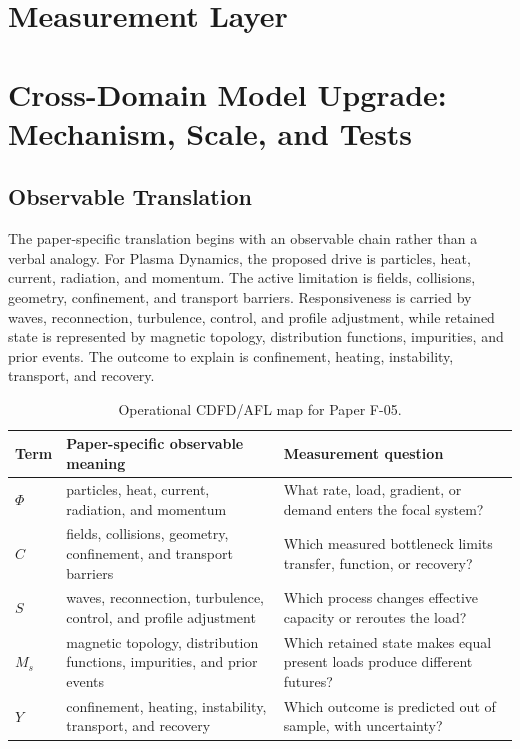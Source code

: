 \documentclass[11pt,a4paper]{article}
\begin{document}
\section{Measurement Layer}

\section{Cross-Domain Model Upgrade: Mechanism, Scale, and Tests}

\subsection{Observable Translation}

The paper-specific translation begins with an observable chain rather than a
verbal analogy. For Plasma Dynamics, the proposed drive is particles, heat, current, radiation, and momentum.
The active limitation is fields, collisions, geometry, confinement, and transport barriers. Responsiveness is carried by
waves, reconnection, turbulence, control, and profile adjustment, while retained state is represented by
magnetic topology, distribution functions, impurities, and prior events. The outcome to explain is confinement, heating, instability, transport, and recovery.

\begin{table}[htbp]
\centering
\small
\caption{Operational CDFD/AFL map for Paper F-05.}
\begin{tabularx}{\textwidth}{|l|X|X|}
\hline
\textbf{Term} & \textbf{Paper-specific observable meaning} & \textbf{Measurement question} \\
\hline
$\Phi$ & particles, heat, current, radiation, and momentum & What rate, load, gradient, or demand enters the focal system? \\
\hline
$C$ & fields, collisions, geometry, confinement, and transport barriers & Which measured bottleneck limits transfer, function, or recovery? \\
\hline
$S$ & waves, reconnection, turbulence, control, and profile adjustment & Which process changes effective capacity or reroutes the load? \\
\hline
$M_s$ & magnetic topology, distribution functions, impurities, and prior events & Which retained state makes equal present loads produce different futures? \\
\hline
$Y$ & confinement, heating, instability, transport, and recovery & Which outcome is predicted out of sample, with uncertainty? \\
\hline
\end{tabularx}
\end{table}
\end{document}
